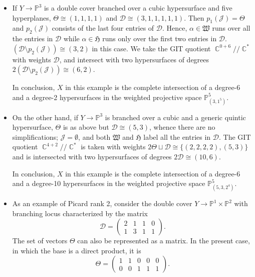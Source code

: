 \documentclass[12pt,a4paper,oneside]{amsart}
\numberwithin{equation}{section}
\theoremstyle{definition}
\theoremstyle{remark}
\DeclareMathOperator{\C}{\mathbb{C}}
\newcommand{\cP}{\mathbb{P}}
\begin{document}
\begin{itemize}
    \item If $Y \longrightarrow \cP^3$ is a double cover branched over a cubic hypersurface and five hyperplanes, $\Theta \cong ( 1,1,1,1)$ and $\mathcal{D} \cong (3,1,1,1,1,1)$. Then $p_1 (\mathscr{J})= \Theta$ and $p_2 (\mathscr{J})$ consists of the last four entries of $\mathcal{D}$. Hence, $\alpha \in \mathfrak{W}$ runs over all the entries in $\mathcal{D}$ while $\alpha \in \mathfrak{H}$ runs only over the first two entries in $\mathcal{D}$. $(\mathcal{D} \setminus p_2 (\mathscr{J})) \cong (3,2)$ in this case. We take the GIT quotient $\C^{0+6} /\!\!/ \C^{*}$ with weights $\mathcal{D}$, and intersect with two hypersurfaces of degrees $2 (\mathcal{D} \setminus p_2 (\mathscr{J})) \cong (6,2)$.\par
    In conclusion, $X$ in this example is the complete intersection of a degree-6 and a degree-2 hypersurfaces in the weighted projective space $\cP^5_{(3,1^5)}$.
    \item On the other hand, if $Y \longrightarrow \cP^3$ is branched over a cubic and a generic quintic hypersurface, $\Theta$ is as above but $\mathcal{D} \cong (5,3)$, whence there are no simplifications; $\mathscr{J}= \emptyset $, and both $\mathfrak{W}$ and $\mathfrak{H}$ label all the entries in $\mathcal{D}$. The GIT quotient $\C^{4+2} /\!\!/ \C^{*}$ is taken with weights $2 \Theta \sqcup \mathcal{D} \cong \{ (2,2,2,2), (5,3) \}$ and is intersected with two hypersurfaces of degrees $2\mathcal{D} \cong (10,6)$.\par
    In conclusion, $X$ in this example is the complete intersection of a degree-6 and a degree-10 hypersurfaces in the weighted projective space $\cP^5_{(5,3,2^4)}$.
    \item As an example of Picard rank 2, consider the double cover $Y \longrightarrow \cP^1 \times \cP^2$ with branching locus characterized by the matrix 
\begin{equation*}
    \mathcal{D} = \left( \begin{matrix} 2 & 1 & 1 & 0 \\ 1 & 3 & 1 & 1 \end{matrix} \right) .
\end{equation*}
The set of vectors $\Theta$ can also be represented as a matrix. In the present case, in which the base is a direct product, it is 
\begin{equation*}
    \Theta = \left( \begin{matrix} 1 & 1 & 0 &0 & 0 \\ 0 & 0 & 1 & 1 & 1\end{matrix} \right) .

\end{equation*}
\end{itemize}
\end{document}
